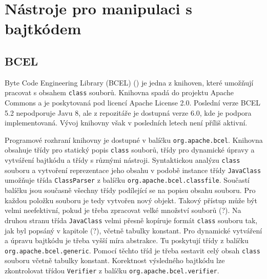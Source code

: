 \chapter{Nástroje pro manipulaci s bajtkódem}




\section{BCEL}



Byte Code Engineering Library (BCEL) () je jedna z knihoven, které umožňují pracovat s obsahem \texttt{class} souborů. Knihovna spadá do projektu Apache Commons a je poskytovaná pod licencí Apache License 2.0. Poslední verze BCEL 5.2 nepodporuje Javu 8, ale z repozitáře je dostupná verze 6.0, kde je podpora implementovaná. Vývoj knihovny však v posledních letech není příliš aktivní. 

Programové rozhraní knihovny je dostupné v balíčku \texttt{org.apache.bcel}. Knihovna obsahuje třídy pro statický popis \texttt{class} souborů, třídy pro dynamické úpravy a vytváření bajtkódu a třídy s různými nástroji. Syntaktickou analýzu \texttt{class} souboru a vytvoření reprezentace jeho obsahu v podobě instance třídy \texttt{JavaClass} umožňuje třída \texttt{ClassParser} z balíčku \texttt{org.apache.bcel.classfile}. Součastí balíčku jsou současně všechny třídy podílející se na popisu obsahu souboru. Pro každou položku souboru je tedy vytvořen nový objekt. Takový přístup může být velmi neefektivní, pokud je třeba zpracovat velké množství souborů (?). Na druhou stranu třída \texttt{JavaClass} velmi přesně kopíruje formát \texttt{class} souboru tak, jak byl popsáný v kapitole (?), včetně tabulky konstant.
Pro dynamické vytváření a úpravu bajtkódu je třeba vyšší míra abstrakce. Tu poskytují třídy z balíčku \texttt{org.apache.bcel.generic}. Pomocí těchto tříd je třeba sestavit celý obsah \texttt{class} souboru včetně tabulky konstant. Korektnost výsledného bajtkódu lze zkontrolovat třídou \texttt{Verifier} z balíčku \texttt{org.apache.bcel.verifier}.

